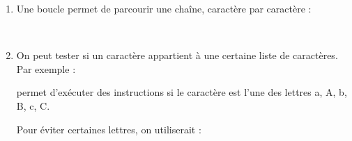 \documentclass[11pt,class=report,crop=false]{standalone}
\begin{document}
\begin{cours}

\sauteligne

\begin{enumerate}
  \item Une boucle  permet de parcourir une chaîne, caractère par caractère :
  \begin{center}
  \begin{minipage}{0.4\textwidth}
  \\
  \indentation {}
  \end{minipage}
  \end{center}

  \item On peut tester si un caractère appartient à une certaine liste de caractères. Par exemple : 
    
  \smallskip
    
  
  
  permet d’exécuter des instructions si le caractère   est l'une des lettres a, A, b, B, c, C. 
  
  Pour éviter certaines lettres, on utiliserait : 
  
  \smallskip
  
  

  \end{enumerate}  
\end{cours}



\end{document}
